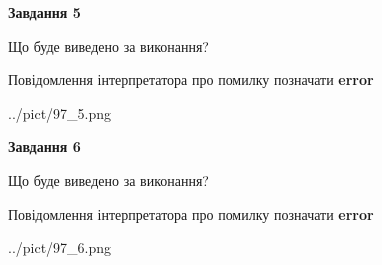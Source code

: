 \documentclass[12pt, ukrainian]{article}
\begin{document}
{{\begin {center}\textbf{Завдання 5}\end {center}}\par
Що буде виведено за виконання? \par
Повідомлення інтерпретатора про помилку позначати \textbf{error}

\begin{center}
	{../pict/97_5.png}
\end{center}
\newpage

{\begin {center}\textbf{Завдання 6}\end {center}}\par
Що буде виведено за виконання? \par
Повідомлення інтерпретатора про помилку позначати \textbf{error}

\begin{center}
	{../pict/97_6.png}
\end{center}
\newpage

}
\end{document}
